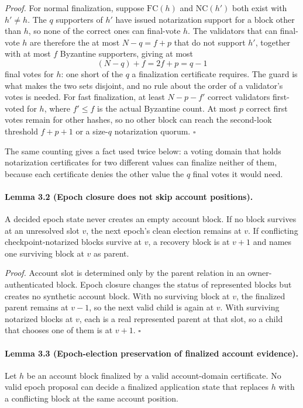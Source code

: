 \documentclass[10pt,twocolumn]{article}
\newcommand{\NC}{\mathrm{NC}}
\newcommand{\FC}{\mathrm{FC}}
\begin{document}
\emph{Proof.} For normal finalization, suppose $\FC(h)$ and $\NC(h')$ both exist with $h'\ne h$. The $q$ supporters of $h'$ have issued notarization support for a block other than $h$, so none of the correct ones can final-vote $h$. The validators that can final-vote $h$ are therefore the at most $N-q=f+p$ that do not support $h'$, together with at most $f$ Byzantine supporters, giving at most
\begin{equation}
(N-q)+f=2f+p=q-1
\end{equation}
final votes for $h$: one short of the $q$ a finalization certificate requires. The guard is what makes the two sets disjoint, and no rule about the order of a validator's votes is needed. For fast finalization, at least $N-p-f'$ correct validators first-voted for $h$, where $f'\le f$ is the actual Byzantine count. At most $p$ correct first votes remain for other hashes, so no other block can reach the second-look threshold $f+p+1$ or a size-$q$ notarization quorum. $\square$

The same counting gives a fact used twice below: a voting domain that holds notarization certificates for two different values can finalize neither of them, because each certificate denies the other value the $q$ final votes it would need.

\paragraph{Lemma 3.2 (Epoch closure does not skip account positions).} A decided epoch state never creates an empty account block. If no block survives at an unresolved slot $v$, the next epoch's clean election remains at $v$. If conflicting checkpoint-notarized blocks survive at $v$, a recovery block is at $v+1$ and names one surviving block at $v$ as parent.

\emph{Proof.} Account slot is determined only by the parent relation in an owner-authenticated block. Epoch closure changes the status of represented blocks but creates no synthetic account block. With no surviving block at $v$, the finalized parent remains at $v-1$, so the next valid child is again at $v$. With surviving notarized blocks at $v$, each is a real represented parent at that slot, so a child that chooses one of them is at $v+1$. $\square$

\paragraph{Lemma 3.3 (Epoch-election preservation of finalized account evidence).} Let $h$ be an account block finalized by a valid account-domain certificate. No valid epoch proposal can decide a finalized application state that replaces $h$ with a conflicting block at the same account position.
\end{document}
